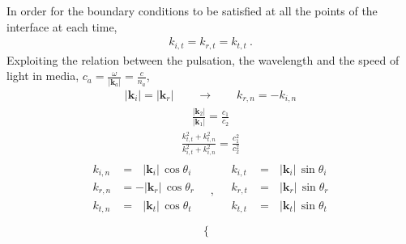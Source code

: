 \documentclass[letterpaper,10pt,italian]{jupyterBook}
\begin{document}
\sphinxAtStartPar
In order for the boundary conditions to be satisfied at all the points of the interface at each time,
\begin{equation*}
\begin{split}k_{i,t} = k_{r,t} = k_{t,t} \ .\end{split}
\end{equation*}
\sphinxAtStartPar
Exploiting the relation between the pulsation, the wave\sphinxhyphen{}length and the speed of light in media, \(c_a = \frac{\omega}{|\mathbf{k}_a|} = \frac{c}{n_a}\),
\begin{equation*}
\begin{split}|\mathbf{k}_i| = |\mathbf{k}_r| \qquad \rightarrow \qquad k_{r,n} = - k_{i,n}\end{split}
\end{equation*}\begin{equation*}
\begin{split}\frac{|\mathbf{k}_2|}{|\mathbf{k}_1|} = \frac{c_1}{c_2}\end{split}
\end{equation*}\begin{equation*}
\begin{split}\frac{k_{t,t}^2 + k_{t,n}^2}{k_{i,t}^2 + k_{i,n}^2} = \frac{c_1^2}{c_2^2}\end{split}
\end{equation*}\begin{equation*}
\begin{split}
\begin{aligned}
  k_{i,n} & = \ \ \ |\mathbf{k}_i| \, \cos \theta_i \\
  k_{r,n} & = -     |\mathbf{k}_r| \, \cos \theta_r \\
  k_{t,n} & = \ \ \ |\mathbf{k}_t| \, \cos \theta_t \\
\end{aligned}
\quad , \quad 
\begin{aligned}
  k_{i,t} & = \ \ \ |\mathbf{k}_i| \, \sin \theta_i \\
  k_{r,t} & = \ \ \ |\mathbf{k}_r| \, \sin \theta_r \\
  k_{t,t} & = \ \ \ |\mathbf{k}_t| \, \sin \theta_t \\
\end{aligned}
\end{split}
\end{equation*}\begin{equation*}
\begin{split}\begin{cases}

\end{cases}
\end{split}
\end{equation*}
\end{document}
